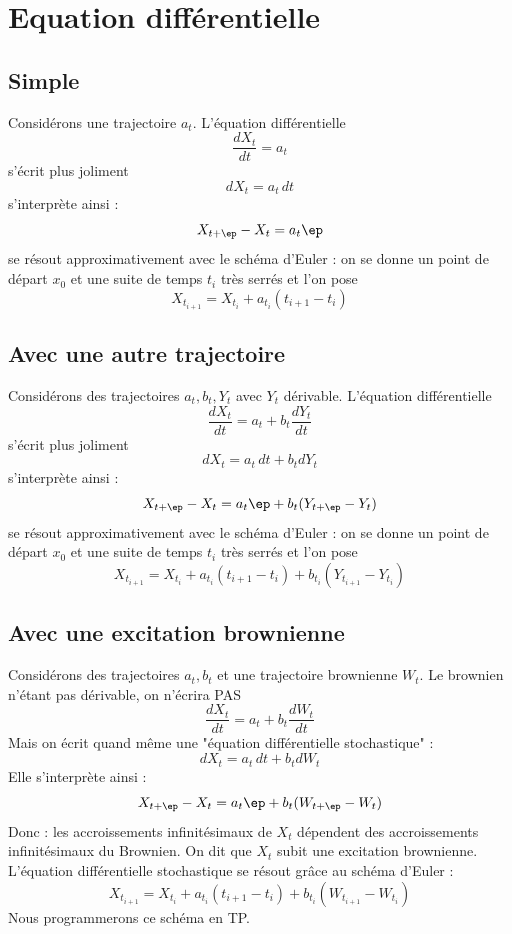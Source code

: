 \documentclass{article}
\begin{document}
\section{Equation différentielle}

\subsection{Simple}
 
Considérons une trajectoire $a_t$.  L'équation différentielle
 $$
   \frac {dX_t}{dt}   =a_t  
  $$
 s'écrit plus joliment
 $$
 dX_t = a_t \, dt
 $$
s'interprète ainsi :  
$$
X_{t+ \ep } -X_t = a_t \ep
$$
 se résout approximativement avec le schéma d'Euler : on se donne un point de départ $x_0$ et une suite de temps $t_i$ très serrés et l'on pose 
$$
X_{t_{i+1}} = X_{t_i} +    a_{t_i} (t_{i+1} -t_i) 
$$




\subsection{Avec une autre trajectoire}

Considérons des trajectoires $a_t,b_t,Y_t$ avec $Y_t$ dérivable.  L'équation différentielle
$$
 \frac {dX_t}{dt} = a_t  + b_t \frac {dY_t}{dt}
 $$
 s'écrit plus joliment
$$
 dX_t = a_t \, dt + b_t dY_t 
 $$
s'interprète ainsi :  
$$
X_{t+ \ep } -X_t = a_t \ep + b_t (Y_{t+\ep}-Y_t) 
$$
se résout approximativement avec le schéma d'Euler : on se donne un point de départ $x_0$ et une suite de temps $t_i$ très serrés et l'on pose 
$$
X_{t_{i+1}} =  X_{t_i} +    a_{t_i} (t_{i+1} -t_i)   + b_{t_i} (Y_{t_{i+1}}- Y_{t_i}) 
$$


\subsection{Avec une excitation brownienne}

Considérons des trajectoires $a_t,b_t$ et une trajectoire brownienne $W_t$.  Le brownien n'étant pas dérivable, on n'écrira PAS
$$
 \frac {dX_t}{dt} = a_t  + b_t \frac {dW_t}{dt}
 $$
 Mais on écrit quand même une "équation différentielle stochastique" :
$$
 dX_t = a_t \, dt + b_t dW_t 
 $$
Elle s'interprète ainsi :  
$$
X_{t+ \ep } -X_t = a_t \ep + b_t (W_{t+\ep}-W_t) 
$$
Donc : les accroissements infinitésimaux de $X_t$ dépendent des accroissements infinitésimaux du Brownien. On dit que $X_t$ subit une excitation brownienne.  L'équation différentielle stochastique se résout grâce au schéma d'Euler :
$$
X_{t_{i+1}} =  X_{t_i} +    a_{t_i} (t_{i+1} -t_i)   + b_{t_i} (W_{t_{i+1}}- W_{t_i}) 
$$
Nous  programmerons ce schéma en TP. 
\end{document}
